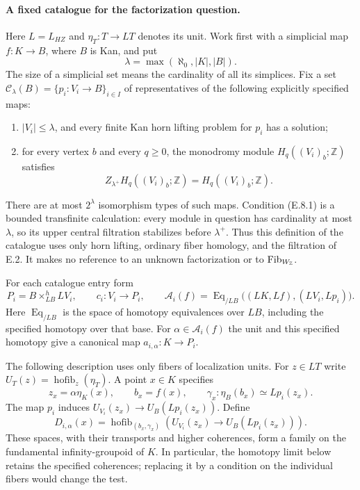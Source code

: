 \paragraph{A fixed catalogue for the factorization question.}
Here $L=L_{HZ}$ and $\eta_T:T\to LT$ denotes its unit.
Work first with a simplicial map $f:K\to B$, where $B$ is Kan,
and put
\[
                 \lambda=\max(\aleph_0,|K|,|B|).
\]
The size of a simplicial set means the cardinality of all its
simplices. Fix a set $\mathcal C_\lambda(B)=\{p_i:V_i\to B\}_{i\in I}$
of representatives of the following explicitly specified maps:
\begin{enumerate}
\item $|V_i|\leq\lambda$, and every finite Kan horn lifting problem
for $p_i$ has a solution;
\item for every vertex $b$ and every $q\geq0$, the monodromy module
$H_q((V_i)_b;\mathbb Z)$ satisfies
\[
 Z_{\lambda^+}H_q((V_i)_b;\mathbb Z)=H_q((V_i)_b;\mathbb Z).
                                                               \tag{E.8.1}
\]
\end{enumerate}
There are at most $2^\lambda$ isomorphism types of such maps.
Condition (E.8.1) is a bounded transfinite calculation: every module
in question has cardinality at most $\lambda$, so its upper central
filtration stabilizes before $\lambda^+$. Thus this definition of
the catalogue uses only horn lifting, ordinary fiber homology,
and the filtration of E.2. It makes no reference to an unknown
factorization or to $\operatorname{Fib}_{W_{\mathbb Z}}$.

For each catalogue entry form
\[
 P_i=B\times^h_{LB}LV_i,\qquad
 c_i:V_i\longrightarrow P_i,\qquad
 \mathcal A_i(f)=
 \operatorname{Eq}_{/LB}\bigl((LK,Lf),(LV_i,Lp_i)\bigr).
                                                               \tag{E.8.2}
\]
Here $\operatorname{Eq}_{/LB}$ is the space of homotopy equivalences
over $LB$, including the specified homotopy over that base.
For $\alpha\in\mathcal A_i(f)$ the unit and this specified homotopy
give a canonical map $a_{i,\alpha}:K\to P_i$.

The following description uses only fibers of localization units.
For $z\in LT$ write $U_T(z)=\operatorname{hofib}_z(\eta_T)$.
A point $x\in K$ specifies
\[
 z_x=\alpha\eta_K(x),\qquad
 b_x=f(x),\qquad
 \gamma_x:\eta_B(b_x)\simeq Lp_i(z_x).
\]
The map $p_i$ induces
$U_{V_i}(z_x)\to U_B(Lp_i(z_x))$. Define
\[
 D_{i,\alpha}(x)=
 \operatorname{hofib}_{(b_x,\gamma_x)}
 \left(U_{V_i}(z_x)\longrightarrow U_B(Lp_i(z_x))\right).
                                                               \tag{E.8.3}
\]
These spaces, with their transports and higher coherences, form a
family on the fundamental infinity-groupoid of $K$. In particular,
the homotopy limit below retains the specified coherences; replacing
it by a condition on the individual fibers would change the test.

